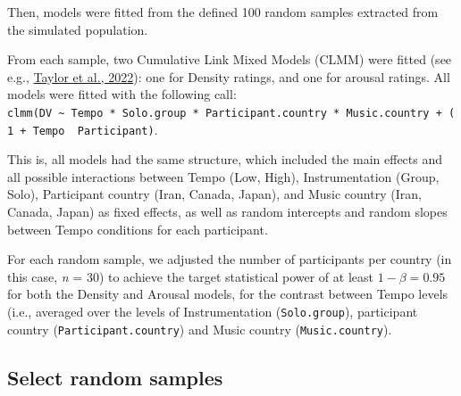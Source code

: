 \documentclass[
  bookmarksnumbered]{article}
\begin{document}
Then, models were fitted from the defined 100 random samples extracted from the simulated population.

From each sample, two Cumulative Link Mixed Models (CLMM) were fitted (see e.g., \protect\hyperlink{ref-taylorRatingNormsShould2022}{Taylor et al., 2022}): one for Density ratings, and one for arousal ratings. All models were fitted with the following call: \texttt{clmm(DV\ \textasciitilde{}\ Tempo\ *\ Solo.group\ *\ Participant.country\ *\ Music.country\ +\ (1\ +\ Tempo\ \textbar{}\ Participant)}.

This is, all models had the same structure, which included the main effects and all possible interactions between Tempo (Low, High), Instrumentation (Group, Solo), Participant country (Iran, Canada, Japan), and Music country (Iran, Canada, Japan) as fixed effects, as well as random intercepts and random slopes between Tempo conditions for each participant.

For each random sample, we adjusted the number of participants per country (in this case, \emph{n} = 30) to achieve the target statistical power of at least \(1 - \beta = 0.95\) for both the Density and Arousal models, for the contrast between Tempo levels (i.e., averaged over the levels of Instrumentation (\texttt{Solo.group}), participant country (\texttt{Participant.country}) and Music country (\texttt{Music.country}).

\hypertarget{select-random-samples}{%
\subsection{Select random samples}\label{select-random-samples}}
\end{document}
